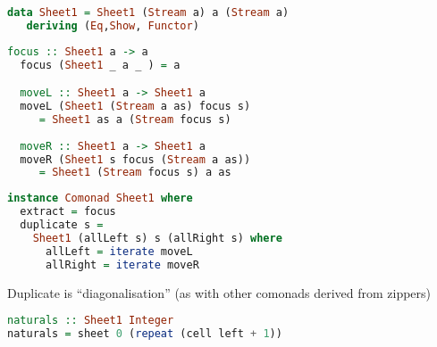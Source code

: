 \documentclass[10pt]{beamer}
\begin{document}
\begin{frame}[fragile]
\begin{lstlisting}[language=haskell, basicstyle=\ttfamily]
data Sheet1 = Sheet1 (Stream a) a (Stream a)
   deriving (Eq,Show, Functor)
\end{lstlisting}
\end{frame}

\begin{frame}[fragile]
  \begin{lstlisting}[language=haskell, basicstyle=\ttfamily]
  focus :: Sheet1 a -> a
  focus (Sheet1 _ a _ ) = a

  moveL :: Sheet1 a -> Sheet1 a
  moveL (Sheet1 (Stream a as) focus s) 
     = Sheet1 as a (Stream focus s)
  
  moveR :: Sheet1 a -> Sheet1 a
  moveR (Sheet1 s focus (Stream a as)) 
     = Sheet1 (Stream focus s) a as
  \end{lstlisting}
\end{frame}

\begin{frame}[fragile]
\begin{lstlisting}[language=haskell, basicstyle=\ttfamily]
instance Comonad Sheet1 where
  extract = focus
  duplicate s = 
    Sheet1 (allLeft s) s (allRight s) where 
      allLeft = iterate moveL
      allRight = iterate moveR
\end{lstlisting}
  Duplicate is ``diagonalisation'' (as with other comonads derived from zippers) 
\end{frame}
\begin{frame}[fragile]
\begin{lstlisting}[language=haskell, basicstyle=\ttfamily]
naturals :: Sheet1 Integer
naturals = sheet 0 (repeat (cell left + 1))



\end{lstlisting}
\end{frame}

\begin{frame}[fragile]
  \begin{lstlisting}[language=haskell, basicstyle=\ttfamily]
  \end{lstlisting}
\end{frame}

\begin{frame}[fragile]
  \begin{lstlisting}[language=haskell, basicstyle=\ttfamily]
  \end{lstlisting}
\end{frame}
\end{document}
